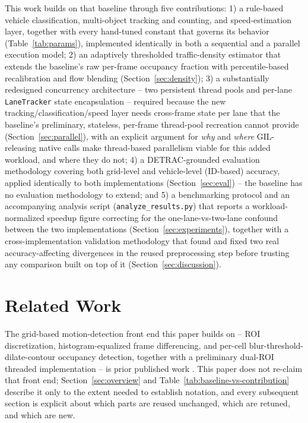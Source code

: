 \documentclass[conference]{IEEEtran}
\newcommand{\code}[1]{\texttt{#1}}
\begin{document}
This work builds on that baseline through five contributions:
1) a rule-based vehicle classification, multi-object tracking and
counting, and speed-estimation layer, together with every hand-tuned
constant that governs its behavior (Table~\ref{tab:params}),
implemented identically in both a sequential and a parallel execution
model; 2) an adaptively thresholded traffic-density estimator that
extends the baseline's raw per-frame occupancy fraction with
percentile-based recalibration and flow blending
(Section~\ref{sec:density}); 3) a substantially redesigned concurrency
architecture -- two persistent thread pools and per-lane
\code{LaneTracker} state encapsulation -- required because the new
tracking/classification/speed layer needs cross-frame state per lane
that the baseline's preliminary, stateless, per-frame thread-pool
recreation cannot provide (Section~\ref{sec:parallel}), with an
explicit argument for \emph{why} and \emph{where} GIL-releasing native
calls make thread-based parallelism viable for this added workload,
and where they do not; 4) a DETRAC-grounded evaluation methodology
covering both grid-level and vehicle-level (ID-based) accuracy,
applied identically to both implementations (Section~\ref{sec:eval}) --
the baseline has no evaluation methodology to extend; and 5) a
benchmarking protocol and an accompanying analysis script
(\code{analyze\_results.py}) that reports a workload-normalized speedup
figure correcting for the one-lane-vs-two-lane confound between the
two implementations (Section~\ref{sec:experiments}), together with a
cross-implementation validation methodology that found and fixed two
real accuracy-affecting divergences in the reused preprocessing step
before trusting any comparison built on top of it
(Section~\ref{sec:discussion}).

\section{Related Work}
\label{sec:related}

The grid-based motion-detection front end this paper builds on --
ROI discretization, histogram-equalized frame differencing, and
per-cell blur-threshold-dilate-contour occupancy detection, together
with a preliminary dual-ROI threaded implementation -- is prior
published work \cite{baseline}. This paper does not re-claim that
front end; Section~\ref{sec:overview} and Table~\ref{tab:baseline-vs-contribution}
describe it only to the extent needed to establish notation, and every
subsequent section is explicit about which parts are reused unchanged,
which are retuned, and which are new.
\end{document}
